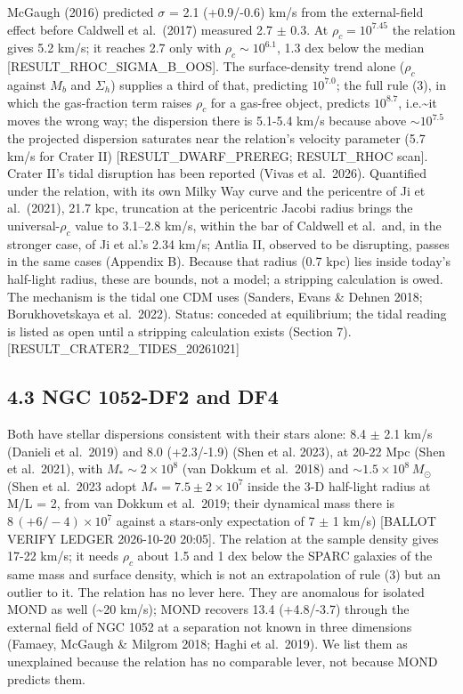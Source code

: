 \documentclass[
  10pt,
]{article}
\begin{document}
McGaugh (2016) predicted $\sigma$ = 2.1 (+0.9/-0.6) km/s from the external-field effect before Caldwell et al.~(2017) measured 2.7 $\pm$ 0.3. At $\rho_c=10^{7.45}$ the relation gives 5.2 km/s; it reaches 2.7 only with $\rho_c\sim 10^{6.1}$, 1.3 dex below the median {[}RESULT\_RHOC\_SIGMA\_B\_OOS{]}. The surface-density trend alone ($\rho_c$ against $M_b$ and $\Sigma_h$) supplies a third of that, predicting $10^{7.0}$; the full rule (3), in which the gas-fraction term raises $\rho_c$ for a gas-free object, predicts $10^{8.7}$, i.e.\textasciitilde{}it moves the wrong way; the dispersion there is 5.1-5.4 km/s because above $\sim 10^{7.5}$ the projected dispersion saturates near the relation's velocity parameter (5.7 km/s for Crater II) {[}RESULT\_DWARF\_PREREG; RESULT\_RHOC scan{]}. Crater II's tidal disruption has been reported (Vivas et al.~2026). Quantified under the relation, with its own Milky Way curve and the pericentre of Ji et al.~(2021), 21.7 kpc, truncation at the pericentric Jacobi radius brings the universal-$\rho_c$ value to 3.1--2.8 km/s, within the bar of Caldwell et al.\ and, in the stronger case, of Ji et al.'s 2.34 km/s; Antlia II, observed to be disrupting, passes in the same cases (Appendix B). Because that radius (0.7 kpc) lies inside today's half-light radius, these are bounds, not a model; a stripping calculation is owed. The mechanism is the tidal one CDM uses (Sanders, Evans \& Dehnen 2018; Borukhovetskaya et al.~2022). Status: conceded at equilibrium; the tidal reading is listed as open until a stripping calculation exists (Section 7). {[}RESULT\_CRATER2\_TIDES\_20261021{]}

\subsection{4.3 NGC 1052-DF2 and DF4}

Both have stellar dispersions consistent with
their stars alone: 8.4 $\pm$ 2.1 km/s (Danieli et al.~2019) and 8.0
(+2.3/-1.9) (Shen et al. 2023), at 20-22 Mpc (Shen et al.~2021), with
$M_*\sim 2\times10^8$ (van Dokkum et al.~2018) and
$\sim1.5\times10^8\,M_\odot$ (Shen et al.~2023 adopt $M_*=7.5\pm2\times10^7$ inside the 3-D half-light radius at M/L = 2, from van Dokkum et
al.~2019; their dynamical mass there is $8\,(+6/-4)\times10^7$ against a
stars-only expectation of 7 $\pm$ 1 km/s) {[}BALLOT VERIFY LEDGER
2026-10-20 20:05{]}. The relation at the sample density gives 17-22 km/s; it
needs $\rho_c$ about 1.5 and 1 dex below the SPARC galaxies of the same
mass and surface density, which is not an extrapolation of rule (3)
but an outlier to it. The relation has no lever here. They are anomalous for
isolated MOND as well (\textasciitilde{}20 km/s); MOND recovers 13.4
(+4.8/-3.7) through the external field of NGC 1052 at a separation not
known in three dimensions (Famaey, McGaugh \& Milgrom 2018; Haghi et
al.~2019). We list them as unexplained because the relation has no comparable
lever, not because MOND predicts them.
\end{document}
